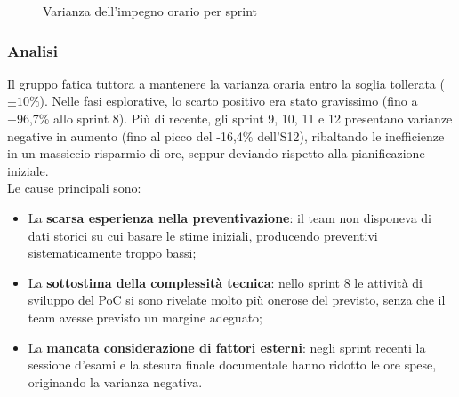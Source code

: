 \documentclass[a4paper,11pt,oneside]{scrartcl}
\begin{document}
\begin{figure}[H]
\centering
{}
\caption{Varianza dell'impegno orario per sprint}
\label{fig:varianza_ore}
\end{figure}

\subsubsection*{Analisi}

Il gruppo fatica tuttora a mantenere la varianza oraria entro la soglia tollerata ($\pm 10\%$). Nelle fasi esplorative, lo scarto positivo era stato gravissimo (fino a +96,7\% allo sprint 8). Più di recente, gli sprint 9, 10, 11 e 12 presentano varianze negative in aumento (fino al picco del -16,4\% dell'S12), ribaltando le inefficienze in un massiccio risparmio di ore, seppur deviando rispetto alla pianificazione iniziale.\\
Le cause principali sono:
\begin{itemize}
    \item La \textbf{scarsa esperienza nella preventivazione}: il team non disponeva di dati storici su cui basare le stime iniziali, producendo preventivi sistematicamente troppo bassi;
    \item La \textbf{sottostima della complessità tecnica}: nello sprint 8 le attività di sviluppo del PoC si sono rivelate molto più onerose del previsto, senza che il team avesse previsto un margine adeguato;
    \item La \textbf{mancata considerazione di fattori esterni}: negli sprint recenti la sessione d'esami e la stesura finale documentale hanno ridotto le ore spese, originando la varianza negativa.
\end{itemize}
\end{document}
